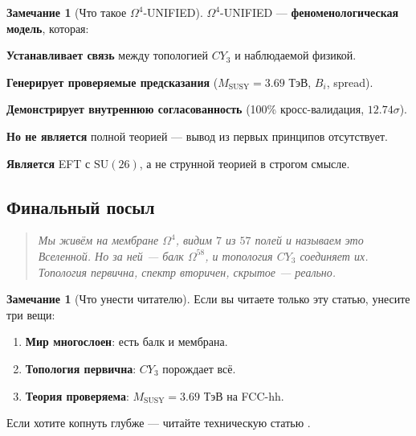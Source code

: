 \documentclass[11pt,a4paper]{article}
\newcommand{\SU}{\mathrm{SU}}
\newcommand{\CY}{CY_3}
\newcommand{\Om}{\Omega^4}
\newcommand{\Omfi}{\Omega^{58}}
\newcommand{\MSUSY}{M_{\text{SUSY}}}
\theoremstyle{definition}
\newtheorem{remark}[theorem]{Замечание}
\begin{document}
\begin{remark}[Что такое $\Om$-UNIFIED]
\label{rem:conclusions-what-is}
$\Om$-UNIFIED — \textbf{феноменологическая модель}, которая:

\medskip\noindent
\textbf{Устанавливает связь} между топологией $\CY$ и 
наблюдаемой физикой.

\medskip\noindent
\textbf{Генерирует проверяемые предсказания} 
($\MSUSY = 3.69$ ТэВ, $B_i$, spread).

\medskip\noindent
\textbf{Демонстрирует внутреннюю согласованность} 
(100\% кросс-валидация, $12.74\sigma$).

\medskip\noindent
\textbf{Но не является} полной теорией — вывод из первых 
принципов отсутствует.

\medskip\noindent
\textbf{Является} EFT с $\SU(26)$, а не струнной теорией 
в строгом смысле.
\end{remark}

\subsection{Финальный посыл}
\label{subsec:conclusions-final-message}

\begin{quote}
\itshape
Мы живём на мембране $\Om$, видим $7$ из $57$ полей и 
называем это Вселенной. Но за ней — балк $\Omfi$, и 
топология $\CY$ соединяет их. Топология первична, 
спектр вторичен, скрытое — реально.
\end{quote}

\begin{remark}[Что унести читателю]
\label{rem:conclusions-takeaway}
Если вы читаете только эту статью, унесите три вещи:
\begin{enumerate}
    \item \textbf{Мир многослоен}: есть балк и мембрана.
    \item \textbf{Топология первична}: $\CY$ порождает всё.
    \item \textbf{Теория проверяема}: $\MSUSY = 3.69$ ТэВ 
          на FCC-hh.
\end{enumerate}
Если хотите копнуть глубже — читайте техническую статью 
\cite{matershov_omega4_2026}.
\end{remark}

\appendix
\end{document}
